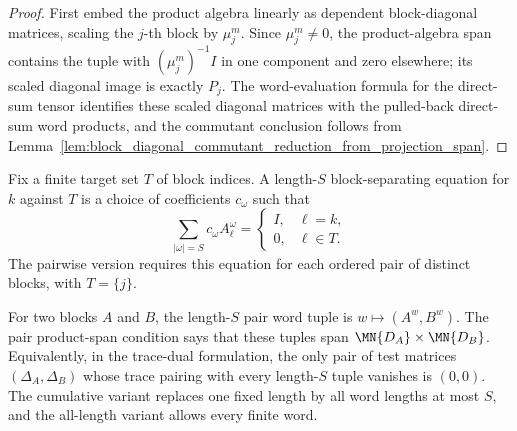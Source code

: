 \begin{proof}
    \notready
    First embed the product algebra linearly as dependent block-diagonal matrices, scaling the
    $j$-th block by $\mu_j^m$. Since $\mu_j^m\neq0$, the product-algebra span contains the
    tuple with $(\mu_j^m)^{-1}I$ in one component and zero elsewhere; its scaled diagonal image is
    exactly $P_j$. The word-evaluation formula for the direct-sum tensor identifies these scaled
    diagonal matrices with the pulled-back direct-sum word products, and the commutant conclusion
    follows from Lemma~\ref{lem:block_diagonal_commutant_reduction_from_projection_span}.
\end{proof}

\begin{definition}
    \label{def:pairwise_block_separating_words}
    \leanok
    Fix a finite target set $T$ of block indices. A length-$S$ block-separating
    equation for $k$ against $T$ is a choice of coefficients $c_\omega$ such that
    \[
        \sum_{|\omega|=S} c_\omega A_\ell^\omega
        =
        \begin{cases}
            I, & \ell=k,    \\
            0, & \ell\in T.
        \end{cases}
    \]
    The pairwise version requires this equation for each ordered pair of
    distinct blocks, with $T=\{j\}$.
\end{definition}

\begin{definition}
    \label{def:pair_trace_separation_words}
    \leanok
    For two blocks $A$ and $B$, the length-$S$ pair word tuple is
    $w \mapsto (A^w,B^w)$. The pair product-span condition says that these
    tuples span $\MN{D_A}\times\MN{D_B}$. Equivalently, in the trace-dual
    formulation, the only pair of test matrices $(\Delta_A,\Delta_B)$ whose
    trace pairing with every length-$S$ tuple vanishes is $(0,0)$. The
    cumulative variant replaces one fixed length by all word lengths at most
    $S$, and the all-length variant allows every finite word.
\end{definition}

